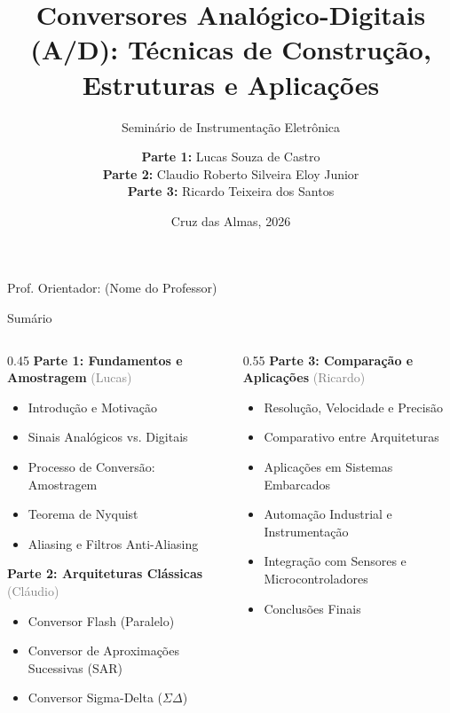 \documentclass{beamer}
\title[Conversores A/D]{Conversores Analógico-Digitais (A/D): Técnicas de Construção, Estruturas e Aplicações}
\subtitle{Seminário de Instrumentação Eletrônica}
\author[Lucas, Cláudio, Ricardo]{
    \textbf{Parte 1:} Lucas Souza de Castro \\
    \textbf{Parte 2:} Claudio Roberto Silveira Eloy Junior \\
    \textbf{Parte 3:} Ricardo Teixeira dos Santos
}
\institute[UFRB]{Universidade Federal do Recôncavo da Bahia \\ Bacharelado em Engenharia Elétrica}
\date{Cruz das Almas, 2026}
\begin{document}
\begin{frame}
    \titlepage
    \begin{center}
        \small{Prof. Orientador: (Nome do Professor)}
    \end{center}
\end{frame}

\begin{frame}{Sumário}
    \begin{columns}[T]
        \begin{column}{0.45\textwidth}
            \textbf{Parte 1: Fundamentos e Amostragem} \hfill \textcolor{gray}{(Lucas)} \\
            \vspace{0.3cm}
            \begin{itemize}
                \item Introdução e Motivação
                \item Sinais Analógicos vs. Digitais
                \item Processo de Conversão: Amostragem
                \item Teorema de Nyquist
                \item Aliasing e Filtros Anti-Aliasing
            \end{itemize}
            \vspace{0.6cm}
            \textbf{Parte 2: Arquiteturas Clássicas} \hfill \textcolor{gray}{(Cláudio)} \\
            \vspace{0.3cm}
            \begin{itemize}
                \item Conversor Flash (Paralelo)
                \item Conversor de Aproximações Sucessivas (SAR)
                \item Conversor Sigma-Delta ($\Sigma\Delta$)
            \end{itemize}
        \end{column}
        \begin{column}{0.55\textwidth}
            \textbf{Parte 3: Comparação e Aplicações} \hfill \textcolor{gray}{(Ricardo)} \\
            \vspace{0.3cm}
            \begin{itemize}
                \item Resolução, Velocidade e Precisão
                \item Comparativo entre Arquiteturas
                \item Aplicações em Sistemas Embarcados
                \item Automação Industrial e Instrumentação
                \item Integração com Sensores e Microcontroladores
                \item Conclusões Finais
            \end{itemize}
        \end{column}
    \end{columns}
\end{frame}
\end{document}

